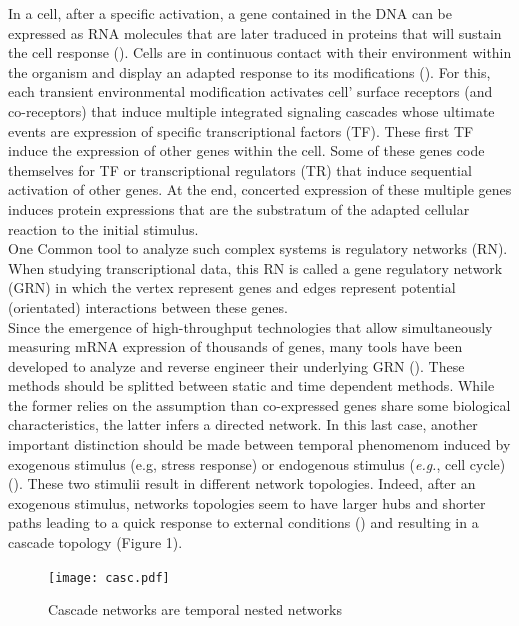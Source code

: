 \documentclass[a4paper]{article}
\begin{document}
In a cell, after a specific activation, a gene contained in the DNA can be expressed as RNA molecules that are later traduced in proteins that will sustain the cell response (\cite{crick1970central}).
Cells are in continuous contact with their environment within the organism and display an adapted response to its modifications (\cite{barabasi2004network}).  
For this, each transient environmental modification activates cell' surface receptors (and co-receptors) that induce multiple integrated signaling cascades whose ultimate events are expression of specific transcriptional factors (TF). 
These first TF induce the expression of other genes within the cell. Some of these genes code themselves for TF or transcriptional regulators (TR) that induce sequential activation of other genes.
At the end, concerted expression of these multiple genes induces protein expressions that are the substratum of the adapted cellular reaction to the initial stimulus.\\

One Common tool to analyze such complex systems is regulatory networks (RN). When studying transcriptional data, this RN is called a gene regulatory network (GRN) in which the vertex represent genes and edges represent potential (orientated) interactions between these genes. \\

Since the emergence of high-throughput technologies that allow simultaneously measuring mRNA expression of thousands of  genes, many tools have been developed to analyze and reverse engineer their underlying GRN (\cite{Bansal07,hecker2009gene,bar2012studying}). 
These methods should be splitted between static   and time dependent methods.  
While the former relies on the assumption than co-expressed genes share some biological characteristics, the latter infers a directed network. 
In this last case, another important distinction should be made between temporal phenomenom induced by exogenous stimulus (e.g, stress response) or endogenous stimulus (\textit{e.g.}, cell cycle)   (\cite{Zhu07,Lusc04,yosef2011impulse}). These two stimulii result in different network topologies. 
Indeed, after an exogenous stimulus, networks topologies seem to have larger hubs and shorter paths leading to a quick response to external conditions (\cite{Lusc04}) and resulting in a cascade topology (Figure 1).  



\begin{figure}[h]
\centering
\texttt{[image: casc.pdf]}
\caption{Cascade networks are temporal nested networks} \label{casc}
\end{figure}
\end{document}
